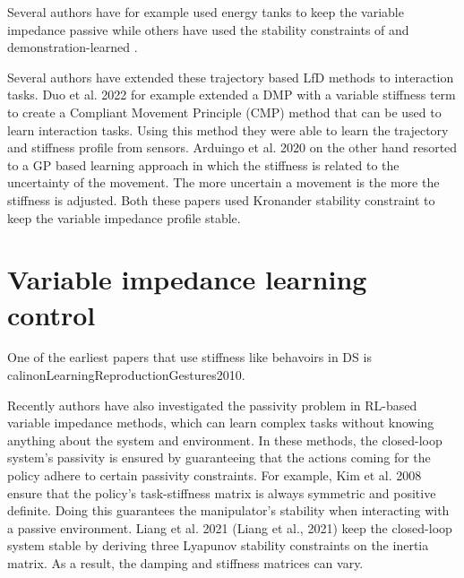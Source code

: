 Several authors have for example used energy tanks to keep the variable impedance passive \cite{amanhoudForceAdaptationContact2020,enayatiVariableImpedanceForceControl2020,kastritsiProgressiveAutomationDMP2018,michelBilateralTeleoperationAdaptive2021,saverianoEnergybasedApproachEnsure2020,shahriariAdaptingContactsEnergy2017,wuFrameworkAutonomousImpedance2021,amanhoudDynamicalSystemApproach2019,kronanderPassiveInteractionControl2016} while others have used the stability constraints of and demonstration-learned \cite{arduengoGaussianProcessbasedRobotLearning2020,douRobotSkillLearning2022}.

Several authors have extended these trajectory based LfD methods to interaction tasks. Duo et al. 2022 for example \cite{douRobotSkillLearning2022} extended a DMP with a variable stiffness term to create a Compliant Movement Principle (CMP) method that can be used to learn interaction tasks. Using this method they were able to learn the trajectory and stiffness profile from sensors. Arduingo et al. 2020 on the other hand resorted to a GP based learning approach in which the stiffness is related to the uncertainty of the movement. The more uncertain a movement is the more the stiffness is adjusted. Both these papers used Kronander stability constraint to keep the variable impedance profile stable.


\section{Variable impedance learning control}


One of the earliest papers that use stiffness like behavoirs in DS is calinonLearningReproductionGestures2010.

Recently authors have also investigated the passivity problem in RL-based variable impedance methods, which can learn complex tasks without knowing anything about the system and environment. In these methods, the closed-loop system's passivity is ensured by guaranteeing that the actions coming for the policy adhere to certain passivity constraints. For example, Kim et al. 2008 \cite{kimLearningRobotStiffness2008} ensure that the policy's task-stiffness matrix is always symmetric and positive definite. Doing this guarantees the manipulator's stability when interacting with a passive environment. Liang et al. 2021 (Liang et al., 2021) keep the closed-loop system stable by deriving three Lyapunov stability constraints on the inertia matrix. As a result, the damping and stiffness matrices can vary.

